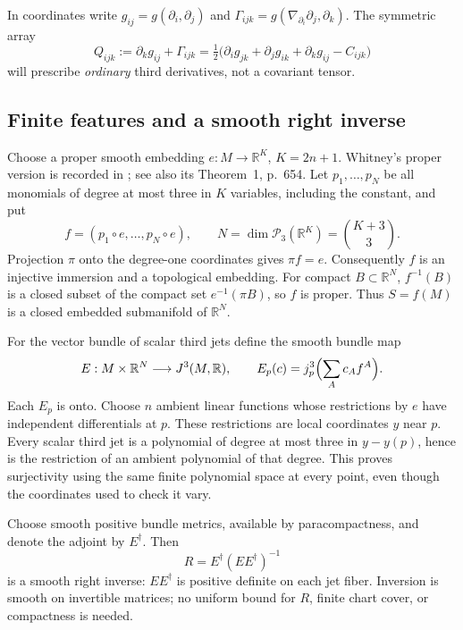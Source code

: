 \documentclass[10pt,letterpaper]{article}
\newcommand{\R}{\mathbb R}
\begin{document}
In coordinates write $g_{ij}=g(\partial_i,\partial_j)$ and
$\Gamma_{ijk}=g(\nabla_{\partial_i}\partial_j,\partial_k)$.
The symmetric array
\begin{equation}\label{eq:Q}
 Q_{ijk}:=\partial_k g_{ij}+\Gamma_{ijk}
 =\tfrac12\bigl(\partial_i g_{jk}+\partial_j g_{ik}
                         +\partial_k g_{ij}-C_{ijk}\bigr)
\end{equation}
will prescribe \emph{ordinary} third derivatives, not a covariant tensor.

\subsection*{Finite features and a smooth right inverse}

Choose a proper smooth embedding $e:M\to\R^K$, $K=2n+1$. Whitney's
proper version is recorded in \cite[Lemma~19, p.~665 and footnote~32]{Whitney};
see also its Theorem~1, p.~654. Let $p_1,\ldots,p_N$ be all monomials of
degree at most three in $K$ variables, including the constant, and put
\begin{equation}\label{eq:feature}
 f=(p_1\circ e,\ldots,p_N\circ e),\qquad
 N=\dim\mathcal P_3(\R^K)=\binom{K+3}{3}.
\end{equation}
Projection $\pi$ onto the degree-one coordinates gives $\pi f=e$.
Consequently $f$ is an injective immersion and a topological embedding.
For compact $B\subset\R^N$, $f^{-1}(B)$ is a closed subset of the compact
set $e^{-1}(\pi B)$, so $f$ is proper. Thus $S=f(M)$ is a closed embedded
submanifold of $\R^N$.

For the vector bundle of scalar third jets define the smooth bundle map
\[
 E:M\times\R^N\longrightarrow J^3(M,\R),\qquad
 E_p(c)=j^3_p\Bigl(\sum_A c_A f^A\Bigr).
\]
Each $E_p$ is onto. Choose $n$ ambient linear functions whose restrictions
by $e$ have independent differentials at $p$. These restrictions are local
coordinates $y$ near $p$. Every scalar third jet is a polynomial of degree
at most three in $y-y(p)$, hence is the restriction of an ambient polynomial
of that degree. This proves surjectivity using the same finite polynomial
space at every point, even though the coordinates used to check it vary.

Choose smooth positive bundle metrics, available by paracompactness, and
denote the adjoint by $E^\dagger$. Then
\begin{equation}\label{eq:rightinverse}
 R=E^\dagger(EE^\dagger)^{-1}
\end{equation}
is a smooth right inverse: $EE^\dagger$ is positive definite on each jet
fiber. Inversion is smooth on invertible matrices; no uniform bound for
$R$, finite chart cover, or compactness is needed.
\end{document}
